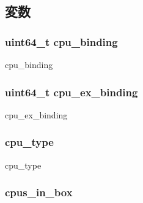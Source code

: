 \subsection{変数}
\hypertarget{structTru64_1_1cpu__info_ad785dd4acdf2b025d47237c0cc60ab83}{
\subsubsection[{cpu\_\-binding}]{\setlength{\rightskip}{0pt plus 5cm}uint64\_\-t {\bf cpu\_\-binding}}}
\label{structTru64_1_1cpu__info_ad785dd4acdf2b025d47237c0cc60ab83}


cpu\_\-binding \hypertarget{structTru64_1_1cpu__info_afa2e4ea220df3f99687c22142a93788e}{
\subsubsection[{cpu\_\-ex\_\-binding}]{\setlength{\rightskip}{0pt plus 5cm}uint64\_\-t {\bf cpu\_\-ex\_\-binding}}}
\label{structTru64_1_1cpu__info_afa2e4ea220df3f99687c22142a93788e}


cpu\_\-ex\_\-binding \hypertarget{structTru64_1_1cpu__info_ac6304017c7a42fa42cee906c65b9aec6}{
\subsubsection[{cpu\_\-type}]{ {\bf cpu\_\-type}}}
\label{structTru64_1_1cpu__info_ac6304017c7a42fa42cee906c65b9aec6}


cpu\_\-type \hypertarget{structTru64_1_1cpu__info_ae4e140571dc31f461adcff810fd04f53}{
\subsubsection[{cpus\_\-in\_\-box}]{ {\bf cpus\_\-in\_\-box}}}
\label{structTru64_1_1cpu__info_ae4e140571dc31f461adcff810fd04f53}


